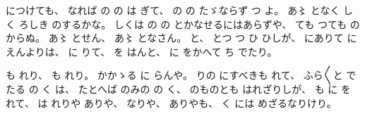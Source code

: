 につけても、
%
なれば
の
の
は
ぎて、
%
の
の
たゞならず
つ
よ。
%
あ〻
となく
しく
ろしき
のするかな。
%
しくは
の
の
とかなせるにはあらずや、
%
ても
つても
の
からぬ。
%
あ〻
とせん、
%
あ〻
となさん。
%
と、
%
とつ
つ
ひ
ひしが、
%
にありて
に
えんよりは、
%
に
りて、
%
を
はんと、
%
に
をかへて
ち
でたり。

%
も
れり、
%
も
れり。
%
かかゝる
に
らんや。
%
りの
にすべきも
れて、
%
ふら〳〵と
でたる
の
く
は、
%
たとへば
のみの
の
く、
%
のものとも
はれざりしが、
%
も
に
を
れて、
%
は
れりや
ありや、
%
なりや、
%
ありやも、
%
く
には
めざるなりけり。
